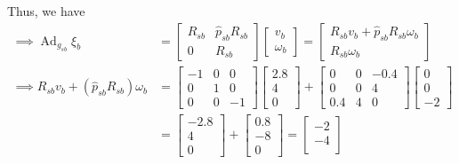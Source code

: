 Thus, we have
\begin{align*}
    \implies
    \operatorname{Ad}_{g_{s b}} \xi_{b}
     & =
    \begin{bmatrix}
        R_{s b} & \widehat{p}_{s b} R_{s b} \\
        0       & R_{s b}
    \end{bmatrix}
    \begin{bmatrix}
        v_b \\
        \omega_b
    \end{bmatrix}
    =
    \begin{bmatrix}
        R_{s b} v_b + \widehat{p}_{s b} R_{s b} \omega_b \\
        R_{s b} \omega_b
    \end{bmatrix}
    \\ \implies
    R_{s b} v_b + (\widehat{p}_{s b} R_{s b}) \omega_b
     & =
    \begin{bmatrix}
        -1 & 0 & 0  \\
        0  & 1 & 0  \\
        0  & 0 & -1
    \end{bmatrix}
    \begin{bmatrix}
        2.8 \\
        4   \\
        0
    \end{bmatrix}
    +
    \begin{bmatrix}
        0   & 0 & -0.4 \\
        0   & 0 & 4    \\
        0.4 & 4 & 0
    \end{bmatrix}
    \begin{bmatrix}
        0 \\
        0 \\
        -2
    \end{bmatrix}
    \\ & =
    \begin{bmatrix}
        -2.8 \\
        4    \\
        0
    \end{bmatrix}
    +
    \begin{bmatrix}
        0.8 \\
        -8  \\
        0
    \end{bmatrix}
    =
    \begin{bmatrix}
        -2 \\
        -4 \\

\end{bmatrix}
\end{align*}
